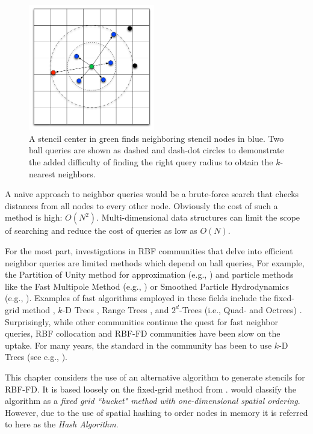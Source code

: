 \documentclass{report}
\begin{document}
\begin{figure}
\centering
\includegraphics[width=5.5cm]{rbffd_methods_content/neighbors/ball_query_vs_kNN.png}
\caption{A stencil center in green finds neighboring stencil nodes in blue. Two ball queries are shown as dashed and dash-dot circles to demonstrate the added difficulty of finding the right query radius to obtain the $k$-nearest neighbors.}
\label{fig:nearest_neighbor_example}
\end{figure}


A na\"{i}ve approach to neighbor queries would be a brute-force search that checks distances from all nodes to every other node. Obviously the cost of such a method is high: $O(N^2)$. Multi-dimensional data structures can limit the scope of searching and reduce the cost of queries as low as $O(N)$. %


For the most part, investigations in RBF communities that delve into efficient neighbor queries are limited methods which depend on ball queries, For example, the Partition of Unity method for approximation (e.g., \cite{Wendland2002,WendlandBook}) and particle methods like the Fast Multipole Method (e.g., \cite{Ying2006, Gumerov2003}) or Smoothed Particle Hydrodynamics (e.g., \cite{Krog2010}). Examples of fast algorithms employed in these fields include the fixed-grid method \cite{WendlandBook,Krog2010}, $k$-D Trees \cite{WendlandBook}, Range Trees \cite{Wendland2002,WendlandBook}, and $2^d$-Trees (i.e., Quad- and Octrees) \cite{Gumerov2003, Ying2006}. Surprisingly, while other communities continue the quest for fast neighbor queries, RBF collocation and RBF-FD communities have been slow on the uptake. For many years, the standard in the community has been to use $k$-D Trees (see e.g., \cite{Fasshauer2007, FlyerLehto11,FornbergLehto11}). 


This chapter considers the use of an alternative algorithm to generate stencils for RBF-FD. It is based loosely on the fixed-grid method from \cite{Krog2010}. \cite{Samet2005} would classify the algorithm as a \emph{fixed grid ``bucket" method with one-dimensional spatial ordering}. However, due to the use of spatial hashing to order nodes in memory it is referred to here as the \emph{Hash Algorithm}. 
\end{document}

